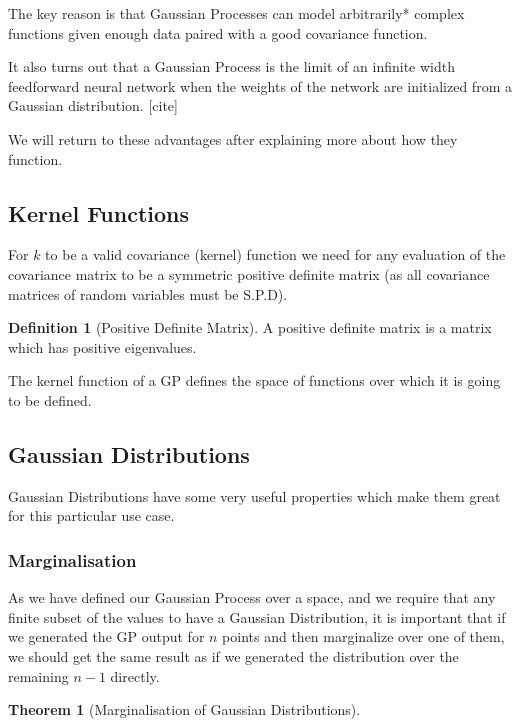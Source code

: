 \documentclass[12pt, a4paper]{report}
\theoremstyle{definition}
\newtheorem{theorem}{Theorem}[section]
\theoremstyle{definition}
\newtheorem{definition}{Definition}[section]
\theoremstyle{definition}
\begin{document}
The key reason is that Gaussian Processes can model arbitrarily* complex functions given enough data paired with a good covariance function.

It also turns out that a Gaussian Process is the limit of an infinite width feedforward neural network when the weights of the network are initialized from a Gaussian distribution. [cite]

We will return to these advantages after explaining more about how they function.

\subsection{Kernel Functions}

For $k$ to be a valid covariance (kernel) function we need for any evaluation of the covariance matrix to be a symmetric positive definite matrix (as all covariance matrices of random variables must be S.P.D).

\begin{definition}[Positive Definite Matrix]
    A positive definite matrix is a matrix which has positive eigenvalues.
\end{definition}

The kernel function of a GP defines the space of functions over which it is going to be defined.

\subsection{Gaussian Distributions}

Gaussian Distributions have some very useful properties which make them great for this particular use case.



\subsubsection{Marginalisation}

As we have defined our Gaussian Process over a space, and we require that any finite subset of the values to have a Gaussian Distribution, it is important that if we generated the GP output for $n$ points and then marginalize over one of them, we should  get the same result as if we generated the distribution over the remaining $n-1$ directly.

\begin{theorem}[Marginalisation of Gaussian Distributions]
    
\end{theorem}
\end{document}
